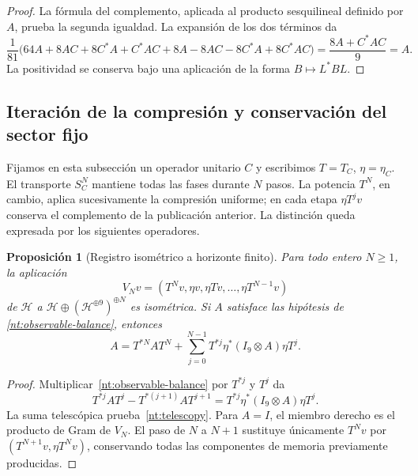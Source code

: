 \documentclass[a4paper,10pt]{article}
\newtheorem{proposition}[theorem]{Proposición}
\theoremstyle{definition}\newtheorem{definition}[theorem]{Definición}
\theoremstyle{remark}\newtheorem{remark}[theorem]{Observación}
\numberwithin{equation}{section}
\begin{document}
\begin{proof}
La fórmula del complemento, aplicada al producto sesquilineal
definido por \(A\), prueba la segunda igualdad. La expansión de
los dos términos da
\[
 \frac1{81}\bigl(
 64A+8AC+8C^*A+C^*AC
 +8A-8AC-8C^*A+8C^*AC\bigr)
 =\frac{8A+C^*AC}{9}=A.
\]
La positividad se conserva bajo una aplicación de la forma
\(B\mapsto L^*BL\).
\end{proof}

\subsection{Iteración de la compresión y conservación del sector fijo}

Fijamos en esta subsección un operador unitario \(C\) y escribimos
\(T=T_C\), \(\eta=\eta_C\). El transporte \(S_C^N\) mantiene todas
las fases durante \(N\) pasos. La potencia \(T^N\), en cambio,
aplica sucesivamente la compresión uniforme; en cada etapa
\(\eta T^jv\) conserva el complemento de la publicación anterior.
La distinción queda expresada por los siguientes operadores.

\begin{proposition}[Registro isométrico a horizonte finito]
Para todo entero \(N\geq1\), la aplicación
\begin{equation}
 V_Nv=(T^Nv,\eta v,\eta Tv,\ldots,\eta T^{N-1}v)
 \label{nt:finite-record}
\end{equation}
de \(\mathcal H\) a
\(\mathcal H\oplus(\mathcal H^{\oplus9})^{\oplus N}\)
es isométrica. Si \(A\) satisface las hipótesis de
\eqref{nt:observable-balance}, entonces
\begin{equation}
 A=T^{*N}AT^N+
 \sum_{j=0}^{N-1}T^{*j}\eta^*(I_9\otimes A)\eta T^j.
 \label{nt:telescopy}
\end{equation}
\end{proposition}

\begin{proof}
Multiplicar~\eqref{nt:observable-balance} por \(T^{*j}\) y
\(T^j\) da
\[
 T^{*j}AT^j-T^{*(j+1)}AT^{j+1}
 =T^{*j}\eta^*(I_9\otimes A)\eta T^j.
\]
La suma telescópica prueba~\eqref{nt:telescopy}. Para \(A=I\),
el miembro derecho es el producto de Gram de \(V_N\).
El paso de \(N\) a \(N+1\) sustituye únicamente \(T^Nv\) por
\((T^{N+1}v,\eta T^Nv)\), conservando todas las componentes
de memoria previamente producidas.
\end{proof}
\end{document}
